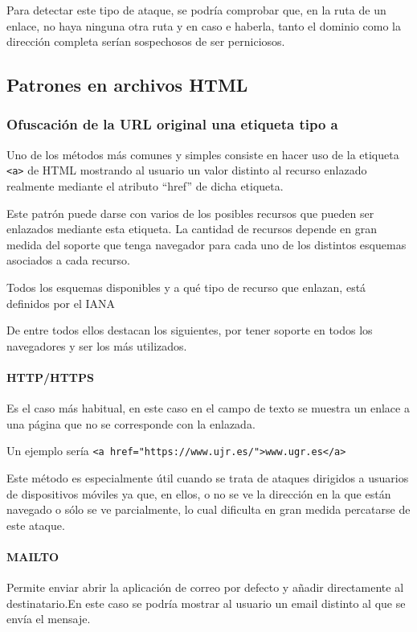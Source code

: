 Para detectar este tipo de ataque, se podría comprobar que, en la ruta de un enlace, no haya ninguna otra ruta y en caso e haberla, tanto el dominio como la dirección completa serían sospechosos de ser perniciosos. 

\subsection{Patrones en archivos HTML}
\subsubsection{Ofuscación de la URL original una etiqueta tipo a}
Uno de los métodos más comunes y simples consiste en hacer uso de la etiqueta \verb!<a>! de HTML mostrando al usuario un valor distinto al recurso enlazado realmente mediante el atributo “href” de dicha etiqueta. 

Este patrón puede darse con varios de los posibles recursos que pueden ser enlazados mediante esta etiqueta. La cantidad de recursos depende en gran medida del soporte que tenga navegador para cada uno de los distintos esquemas asociados a cada recurso.

Todos los esquemas disponibles y a qué tipo de recurso que enlazan, está definidos por el IANA \cite{Schemas_dispo}

De entre todos ellos destacan los siguientes, por tener soporte en todos los navegadores y ser los más utilizados.

\paragraph{HTTP/HTTPS}
Es el caso más habitual, en este caso en el campo de texto se muestra un enlace a una página que no se corresponde con la enlazada. 

Un ejemplo sería \verb|<a href="https://www.ujr.es/">www.ugr.es</a>|

Este método es especialmente útil cuando se trata de ataques dirigidos a usuarios de dispositivos móviles ya que, en ellos, o no se ve la dirección en la que están navegado o sólo se ve parcialmente, lo cual dificulta en gran medida percatarse de este ataque. 

\paragraph{MAILTO}
Permite enviar abrir la aplicación de correo por defecto y añadir directamente al destinatario.En este caso se podría mostrar al usuario un email distinto al que se envía el mensaje. 

